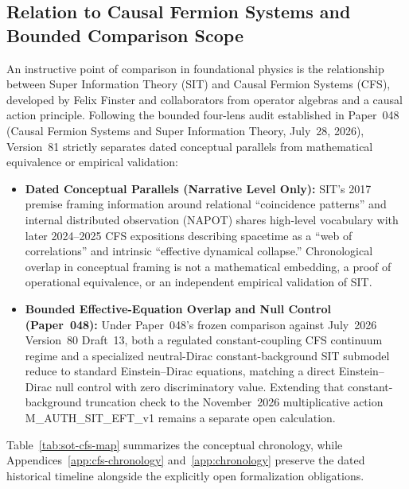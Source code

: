 \documentclass[american,11pt,letterpaper]{article}
\def\texttt#1{#1}%
\def\emph#1{#1}%
\begin{document}
\subsection{Relation to Causal Fermion Systems and Bounded Comparison Scope}
\label{sec:cfs-convergence}

An instructive point of comparison in foundational physics is the relationship between Super Information Theory (SIT) and Causal Fermion Systems (CFS), developed by Felix Finster and collaborators from operator algebras and a causal action principle. Following the bounded four-lens audit established in Paper~048 (\emph{Causal Fermion Systems and Super Information Theory}, July~28, 2026), Version~81 strictly separates dated conceptual parallels from mathematical equivalence or empirical validation:
\begin{itemize}
  \item \textbf{Dated Conceptual Parallels (Narrative Level Only):} SIT's 2017 premise framing information around relational ``coincidence patterns'' and internal distributed observation (NAPOT) shares high-level vocabulary with later 2024--2025 CFS expositions describing spacetime as a ``web of correlations'' and intrinsic ``effective dynamical collapse.'' Chronological overlap in conceptual framing is \emph{not} a mathematical embedding, a proof of operational equivalence, or an independent empirical validation of SIT.
  \item \textbf{Bounded Effective-Equation Overlap and Null Control (Paper~048):} Under Paper~048's frozen comparison against July~2026 Version~80 Draft~13, both a regulated constant-coupling CFS continuum regime and a specialized neutral-Dirac constant-background SIT submodel reduce to standard Einstein--Dirac equations, matching a direct Einstein--Dirac null control with \emph{zero discriminatory value}. Extending that constant-background truncation check to the November~2026 multiplicative action \texttt{M\_AUTH\_SIT\_EFT\_v1} remains a separate open calculation.
\end{itemize}

Table~\ref{tab:sot-cfs-map} summarizes the conceptual chronology, while Appendices~\ref{app:cfs-chronology} and~\ref{app:chronology} preserve the dated historical timeline alongside the explicitly open formalization obligations.
\end{document}
